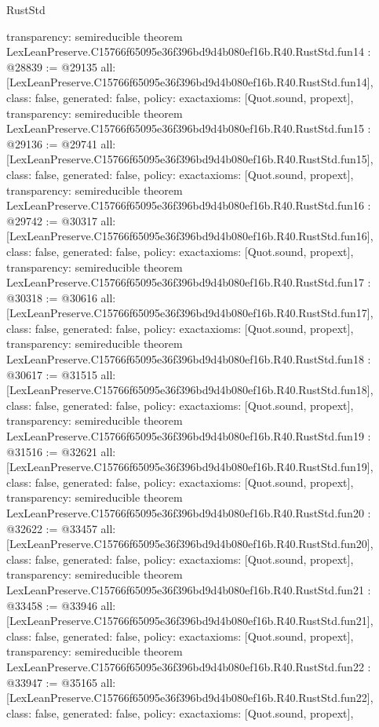 \begin{lexlean}{RustStd}
\begin{coremodule}
{  transparency: semireducible
}
theorem LexLeanPreserve.C15766f65095e36f396bd9d4b080ef16b.R40.RustStd.fun14 : @28839 := @29135 {
  all: [LexLeanPreserve.C15766f65095e36f396bd9d4b080ef16b.R40.RustStd.fun14],
  class: false,
  generated: false,
  policy: exact{axioms: [Quot.sound, propext]},
  transparency: semireducible
}
theorem LexLeanPreserve.C15766f65095e36f396bd9d4b080ef16b.R40.RustStd.fun15 : @29136 := @29741 {
  all: [LexLeanPreserve.C15766f65095e36f396bd9d4b080ef16b.R40.RustStd.fun15],
  class: false,
  generated: false,
  policy: exact{axioms: [Quot.sound, propext]},
  transparency: semireducible
}
theorem LexLeanPreserve.C15766f65095e36f396bd9d4b080ef16b.R40.RustStd.fun16 : @29742 := @30317 {
  all: [LexLeanPreserve.C15766f65095e36f396bd9d4b080ef16b.R40.RustStd.fun16],
  class: false,
  generated: false,
  policy: exact{axioms: [Quot.sound, propext]},
  transparency: semireducible
}
theorem LexLeanPreserve.C15766f65095e36f396bd9d4b080ef16b.R40.RustStd.fun17 : @30318 := @30616 {
  all: [LexLeanPreserve.C15766f65095e36f396bd9d4b080ef16b.R40.RustStd.fun17],
  class: false,
  generated: false,
  policy: exact{axioms: [Quot.sound, propext]},
  transparency: semireducible
}
theorem LexLeanPreserve.C15766f65095e36f396bd9d4b080ef16b.R40.RustStd.fun18 : @30617 := @31515 {
  all: [LexLeanPreserve.C15766f65095e36f396bd9d4b080ef16b.R40.RustStd.fun18],
  class: false,
  generated: false,
  policy: exact{axioms: [Quot.sound, propext]},
  transparency: semireducible
}
theorem LexLeanPreserve.C15766f65095e36f396bd9d4b080ef16b.R40.RustStd.fun19 : @31516 := @32621 {
  all: [LexLeanPreserve.C15766f65095e36f396bd9d4b080ef16b.R40.RustStd.fun19],
  class: false,
  generated: false,
  policy: exact{axioms: [Quot.sound, propext]},
  transparency: semireducible
}
theorem LexLeanPreserve.C15766f65095e36f396bd9d4b080ef16b.R40.RustStd.fun20 : @32622 := @33457 {
  all: [LexLeanPreserve.C15766f65095e36f396bd9d4b080ef16b.R40.RustStd.fun20],
  class: false,
  generated: false,
  policy: exact{axioms: [Quot.sound, propext]},
  transparency: semireducible
}
theorem LexLeanPreserve.C15766f65095e36f396bd9d4b080ef16b.R40.RustStd.fun21 : @33458 := @33946 {
  all: [LexLeanPreserve.C15766f65095e36f396bd9d4b080ef16b.R40.RustStd.fun21],
  class: false,
  generated: false,
  policy: exact{axioms: [Quot.sound, propext]},
  transparency: semireducible
}
theorem LexLeanPreserve.C15766f65095e36f396bd9d4b080ef16b.R40.RustStd.fun22 : @33947 := @35165 {
  all: [LexLeanPreserve.C15766f65095e36f396bd9d4b080ef16b.R40.RustStd.fun22],
  class: false,
  generated: false,
  policy: exact{axioms: [Quot.sound, propext]},
}
\end{coremodule}
\end{lexlean}

